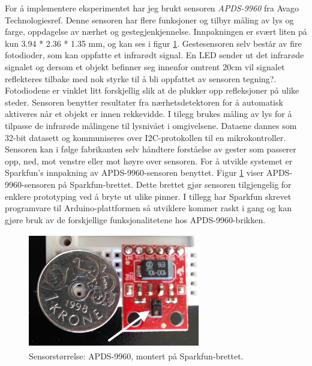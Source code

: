 For å implementere eksperimentet har jeg brukt sensoren \emph{APDS-9960} fra Avago Technologies{\color{red}ref}. Denne sensoren har flere funksjoner og tilbyr måling av lys og farge, oppdagelse av nærhet og gestegjenkjennelse. Innpakningen er svært liten på kun 3.94 * 2.36 * 1.35 mm, og kan ses i figur \ref{fig:sensor-size}. Gestesensoren selv består av fire fotodioder, som kan oppfatte et infrarødt signal. En LED sender ut det infrarøde signalet og dersom et objekt befinner seg innenfor omtrent 20cm vil signalet reflekteres tilbake med nok styrke til å bli oppfattet av sensoren {\color{red}tegning?}. Fotodiodene er vinklet litt forskjellig slik at de plukker opp refleksjoner på ulike steder. Sensoren benytter resultater fra nærhetsdetektoren for å automatisk aktiveres når et objekt er innen rekkevidde. I tilegg brukes måling av lys for å tilpasse de infrarøde målingene til lysnivået i omgivelsene. Dataene dannes som 32-bit datasett og kommuniseres over I2C-protokollen til en mikrokontroller. Sensoren kan i følge fabrikanten selv håndtere forståelse av gester som passerer opp, ned, mot venstre eller mot høyre over sensoren. For å utvikle systemet er Sparkfun's innpakning av APDS-9960-sensoren benyttet. Figur \ref{fig:sensor-size} viser APDS-9960-sensoren på Sparkfun-brettet. Dette brettet gjør sensoren tilgjengelig for enklere prototyping ved å bryte ut ulike pinner. I tillegg har Sparkfun skrevet programvare til Arduino-plattformen så utviklere kommer raskt i gang og kan gjøre bruk av de forskjellige funksjonalitetene hos APDS-9960-brikken.
\begin{figure}[h]
\centering
\includegraphics[width=7.5cm, height=5cm]{fig/sensor-size}
\caption{Sensorstørrelse: APDS-9960, montert på Sparkfun-brettet.}
\label{fig:sensor-size}
\end{figure}

